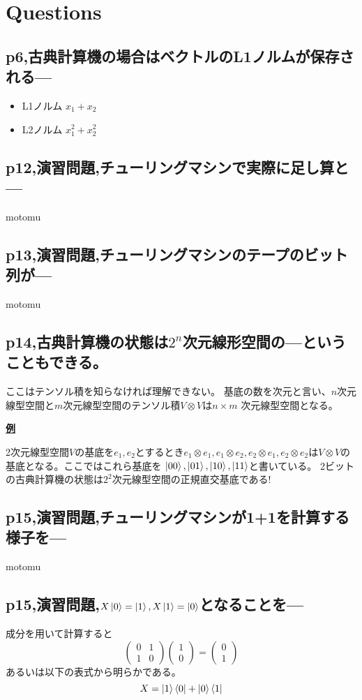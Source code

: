 \documentclass[b5paper,fleqn]{ltjsarticle}
\newcommand\s[1]{\subsection*{#1}\noindent\ignorespaces}
\newcommand\mat[2]{\left(\begin{array}{#1}#2\end{array}\right)}
\begin{document}
\section{Questions}
\s{p6,古典計算機の場合はベクトルのL1ノルムが保存される---}
\begin{itemize}
  \item L1ノルム $x_1+x_2$
  \item L2ノルム $x_1^2+x_2^2$
\end{itemize}
\s{p12,演習問題,チューリングマシンで実際に足し算と---}
motomu
\s{p13,演習問題,チューリングマシンのテープのビット列が---}
motomu
\s{p14,古典計算機の状態は$2^n$次元線形空間の---ということもできる。}
ここはテンソル積を知らなければ理解できない。
基底の数を次元と言い、$n$次元線型空間と$m$次元線型空間のテンソル積$V\otimes V$は$n\times m$
次元線型空間となる。\par
\underline{\bf 例}\par\noindent
2次元線型空間$V$の基底を$e_1,e_2$とするとき$e_1\otimes e_1,e_1\otimes e_2,e_2\otimes e_1,
e_2\otimes e_2$は$V\otimes V$の基底となる。ここではこれら基底を
$\ket{00},\ket{01},\ket{10},\ket{11}$と書いている。
2ビットの古典計算機の状態は$2^2$次元線型空間の正規直交基底である!
\s{p15,演習問題,チューリングマシンが1+1を計算する様子を---}
motomu
\s{p15,演習問題,$X\ket{0}=\ket{1},X\ket{1}=\ket{0}$となることを---}
成分を用いて計算すると
\[\mat{cc}{ 0&1\\ 1&0}
    \mat{c}{1\\0}=\mat{c}{0\\1}\]
あるいは以下の表式から明らかである。
\[X=\ket{1}\bra{0}+\ket{0}\bra{1}\]
\end{document}
